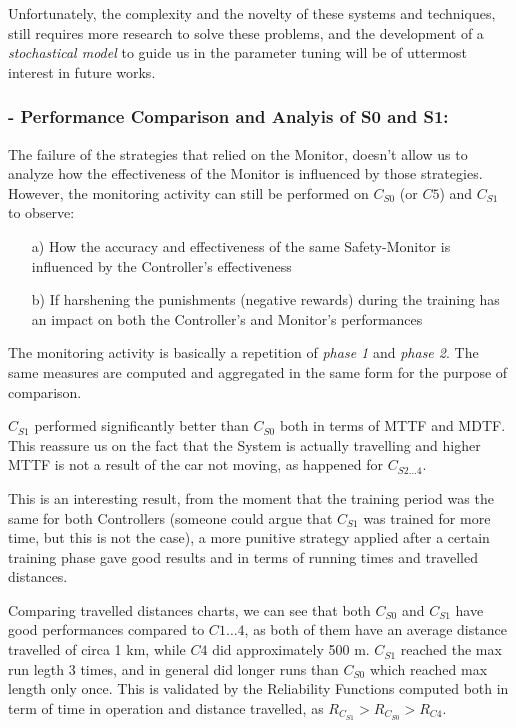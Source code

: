 Unfortunately, the complexity and the novelty of these systems and techniques, still requires more research to solve these problems, and the development of a \textsl{stochastical model} to guide us in the parameter tuning will be of uttermost interest in future works.

\subsubsection{- Performance Comparison and Analyis of S0 and S1:}

The failure of the strategies that relied on the Monitor, doesn't allow us to analyze how the effectiveness of the Monitor is influenced by those strategies. However, the monitoring activity can still be performed on $C_{S0}$ (or $C5$) and $C_{S1}$ to observe:

\begin{itemize}
	\item[a)] How the accuracy and effectiveness of the same Safety-Monitor is influenced by the Controller's effectiveness
	\item[b)] If harshening the punishments (negative rewards) during the training has an impact on both the Controller's and Monitor's performances
\end{itemize}

The monitoring activity is basically a repetition of \textsl{phase 1} and \textsl{phase 2}. The same measures are computed and aggregated in the same form for the purpose of comparison.

$C_{S1}$ performed significantly better than $C_{S0}$ both in terms of MTTF and MDTF. This reassure us on the fact that the System is actually travelling and higher MTTF is not a result of the car not moving, as happened for $C_{S2\dots 4}$.

This is an interesting result, from the moment that the training period was the same for both Controllers (someone could argue that $C_{S1}$ was trained for more time, but this is not the case), a more punitive strategy applied after a certain training phase gave good results and in terms of running times and travelled distances.
\newline

Comparing travelled distances charts, we can see that both $C_{S0}$ and $C_{S1}$ have good performances compared to $C1\dots 4$, as both of them have an average distance travelled of circa 1 km, while $C4$ did approximately 500 m. $C_{S1}$ reached the max run legth 3 times, and in general did longer runs than $C_{S0}$ which reached max length only once.
This is validated by the Reliability Functions computed both in term of time in operation and distance travelled, as $R_{C_{S1}} > R_{C_{S0}} > R_{C4}$.

